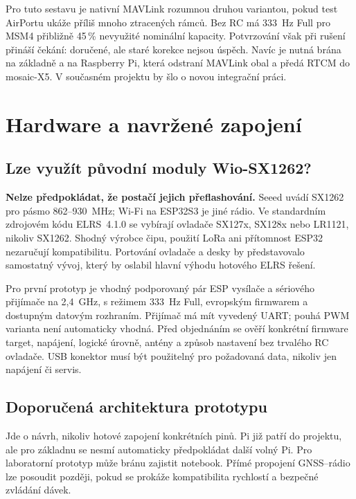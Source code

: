 \documentclass[11pt,a4paper]{article}
\begin{document}
Pro tuto sestavu je nativní MAVLink rozumnou druhou variantou, pokud test AirPortu ukáže příliš mnoho ztracených rámců. Bez RC má 333~Hz Full pro MSM4 přibližně 45\,\% nevyužité nominální kapacity. Potvrzování však při rušení přináší čekání: doručené, ale staré korekce nejsou úspěch. Navíc je nutná brána na základně a na Raspberry Pi, která odstraní MAVLink obal a předá RTCM do mosaic-X5. V současném projektu by šlo o novou integrační práci.

\section{Hardware a navržené zapojení}
\subsection{Lze využít původní moduly Wio-SX1262?}
\textbf{Nelze předpokládat, že postačí jejich přeflashování.} Seeed uvádí SX1262 pro pásmo 862--930~MHz; Wi-Fi na ESP32S3 je jiné rádio.\cite{seeed} Ve standardním zdrojovém kódu ELRS~4.1.0 se vybírají ovladače SX127x, SX128x nebo LR1121, nikoliv SX1262.\cite{common} Shodný výrobce čipu, použití LoRa ani přítomnost ESP32 nezaručují kompatibilitu. Portování ovladače a desky by představovalo samostatný vývoj, který by oslabil hlavní výhodu hotového ELRS řešení.

Pro první prototyp je vhodný podporovaný pár ESP vysílače a sériového přijímače na 2,4~GHz, s režimem 333~Hz Full, evropským firmwarem a dostupným datovým rozhraním. Přijímač má mít vyvedený UART; pouhá PWM varianta není automaticky vhodná. Před objednáním se ověří konkrétní firmware target, napájení, logické úrovně, antény a způsob nastavení bez trvalého RC ovladače. USB konektor musí být použitelný pro požadovaná data, nikoliv jen napájení či servis.

\subsection{Doporučená architektura prototypu}
\begin{center}
\end{center}
Jde o návrh, nikoliv hotové zapojení konkrétních pinů. Pi již patří do projektu, ale pro základnu se nesmí automaticky předpokládat další volný Pi. Pro laboratorní prototyp může bránu zajistit notebook. Přímé propojení GNSS--rádio lze posoudit později, pokud se prokáže kompatibilita rychlostí a bezpečné zvládání dávek.
\end{document}
